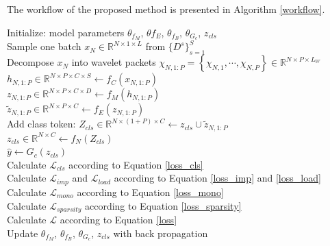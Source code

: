 \documentclass{article}
\begin{document}
	The workflow of the proposed method is presented in Algorithm \ref{workflow}. 
	\begin{algorithm}[t!]
		\caption{Workflow of the proposed method}
		\label{workflow}
		Initialize: model parameters $\theta_{f_{M}}$, $\theta{f_{E}}$, $\theta_{f_{B}}$, $\theta_{G_{c}}$, $z_{cls}$\\
		{
			{
				Sample one batch $x_{N}\in\mathbb{R}^{N\times1\times L}$ from $\{D^{s}\}_{s=1}^{S}$\\
				Decompose $x_{N}$ into wavelet packets $\chi_{N,1:P}=\left\{\chi_{N,1},\cdots,\chi_{N,P}\right\}\in\mathbb{R}^{N\times P\times L_{W}}$ \\
				$h_{N,1:P}\in\mathbb{R}^{N\times P\times C\times S}\leftarrow f_{C}\left(x_{N,1:P}\right)$ \\
				$z_{N,1:P}\in\mathbb{R}^{N\times P\times C\times D}\leftarrow f_{M}\left(h_{N,1:P}\right)$ \\
				$\tilde{z}_{N,1:P} \in\mathbb{R}^{N\times P\times C} \leftarrow f_{E}\left(z_{N,1:P}\right)$ \\
				Add class token: $Z_{cls}\in\mathbb{R}^{N\times(1+P)\times C}\leftarrow z_{cls}\cup\tilde{z}_{N,1:P}$ \\
				$z_{cls}\in\mathbb{R}^{N\times C}\leftarrow f_{N}(Z_{cls})$ \\
				$\hat{y}\leftarrow G_{c}(z_{cls})$ \\
				Calculate $\mathcal{L}_{cls}$ according to Equation \ref{loss_cls} \\
				Calculate $\mathcal{L}_{imp}$ and $\mathcal{L}_{load}$ according to Equation \ref{loss_imp} and \ref{loss_load} \\
				Calculate $\mathcal{L}_{mono}$ according to Equation \ref{loss_mono} \\
				Calculate $\mathcal{L}_{sparsity}$ according to Equation \ref{loss_sparsity} \\
				Calculate $\mathcal{L}$ according to Equation \ref{loss} \\
				Update $\theta_{f_{M}}$, $\theta_{f_{B}}$, $\theta_{G_{c}}$, $z_{cls}$ with back propagation
			}
		}
	\end{algorithm}
	
\end{document}
